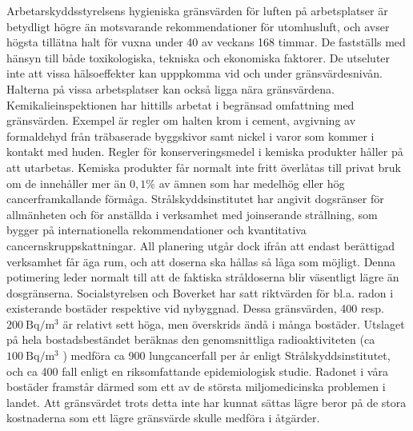 Arbetarskyddsstyrelsens hygieniska gränsvärden för luften på arbetsplatser är betydligt högre än motsvarande rekommendationer för utomhusluft, och avser högsta tillätna halt för vuxna under 40 av veckans 168 timmar. De fastställs med hänsyn till både toxikologiska, tekniska och ekonomiska faktorer. De utseluter inte att vissa hälsoeffekter kan upppkomma vid och under gränsvärdesnivån. Halterna på vissa arbetsplatser kan också ligga nära gränsvärdena.
Kemikalieinspektionen har hittills arbetat i begränsad omfattning med gränsvärden. Exempel är regler om halten krom i cement, avgivning av formaldehyd från träbaserade byggskivor samt nickel i varor som kommer i kontakt med huden. Regler för konserveringsmedel i kemiska produkter håller på att utarbetas. Kemiska produkter får normalt inte fritt överlåtas till privat bruk om de innehåller mer än \(0,1 \%\) av ämnen som har medelhög eller hög cancerframkallande förmåga.
Strålskyddsinstitutet har angivit dogsränser för allmänheten och för anställda i verksamhet med joinserande strållning, som bygger på internationella rekommendationer och kvantitativa cancernskruppskattningar. All planering utgår dock ifrån att endast berättigad verksamhet får äga rum, och att doserna ska hållas så låga som möjligt. Denna potimering leder normalt till att de faktiska stråldoserna blir väsentligt lägre än dosgränserna.
Socialstyrelsen och Boverket har satt riktvärden för bl.a. radon i existerande bostäder respektive vid nybyggnad. Dessa gränsvärden, 400 resp. \(200 \mathrm{~Bq} / \mathrm{m}^{3}\) är relativt sett höga, men överskrids ändå i många bostäder. Utslaget på hela bostadsbeständet beräknas den genomsnittliga radioaktiviteten (ca \(100 \mathrm{~Bq} / \mathrm{m}^{3}\) ) medföra ca 900 lungcancerfall per år enligt Strålskyddsinstitutet, och ca 400 fall enligt en riksomfattande epidemiologisk studie. Radonet i våra bostäder framstår därmed som ett av de största miljomedicinska problemen i landet. Att gränsvärdet trots detta inte har kunnat sättas lägre beror på de stora kostnaderna som ett lägre gränsvärde skulle medföra i åtgärder.

